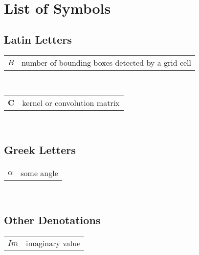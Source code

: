 \section*{List of Symbols}

\newcommand*\dif{\mathop{}\!\mathrm{d}}

\newcommand\declare[2]{
 \begin{tabular}{p{15mm}l}
  $#1$ & #2\\
 \end{tabular}
}
\newcommand\define[3]{
 \newcommand{#1}{#2}
 \declare{#2}{#3}
}
\newcommand\redefine[3]{
 \renewcommand{#1}{#2}
 \declare{#2}{#3}
}


\subsection*{Latin Letters}
 \declare   {B}   {number of bounding boxes detected by a grid cell}\\
 \define   {\convm}   {\mathbf{C}}		{kernel or convolution matrix}\\

\subsection*{Greek Letters}
 \declare   {\alpha}   {some angle} \\

\subsection*{Other Denotations}
 \declare   {Im}   {imaginary value}\\

